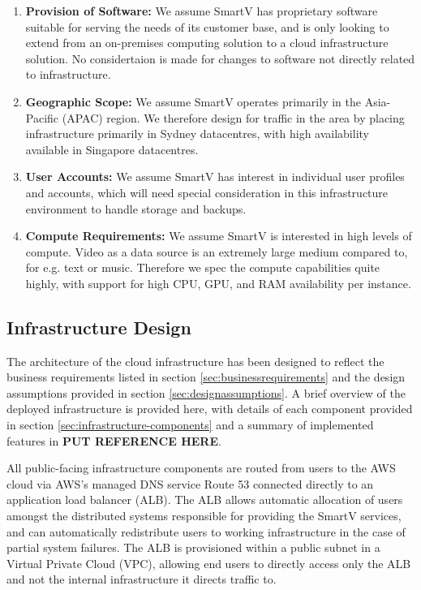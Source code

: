 \begin{enumerate}
    \item \textbf{Provision of Software:} We assume SmartV has proprietary software suitable for serving the needs of its customer base, and is only looking to extend from an on-premises computing solution to a cloud infrastructure solution. No considertaion is made for changes to software not directly related to infrastructure.
    \item \textbf{Geographic Scope:} We assume SmartV operates primarily in the Asia-Pacific (APAC) region. We therefore design for traffic in the area by placing infrastructure primarily in Sydney datacentres, with high availability available in Singapore datacentres.
    \item \textbf{User Accounts:} We assume SmartV has interest in individual user profiles and accounts, which will need special consideration in this infrastructure environment to handle storage and backups.
    \item \textbf{Compute Requirements:} We assume SmartV is interested in high levels of compute. Video as a data source is an extremely large medium compared to, for e.g. text or music. Therefore we spec the compute capabilities quite highly, with support for high CPU, GPU, and RAM availability per instance.
\end{enumerate}

\subsection{Infrastructure Design}

The architecture of the cloud infrastructure has been designed to reflect the business requirements listed in section \ref{sec:businessrequirements} and the design assumptions provided in section \ref{sec:designassumptions}. A brief overview of the deployed infrastructure is provided here, with details of each component provided in section \ref{sec:infrastructure-components} and a summary of implemented features in \textbf{PUT REFERENCE HERE}.

All public-facing infrastructure components are routed from users to the AWS cloud via AWS's managed DNS service Route 53 connected directly to an application load balancer (ALB). The ALB allows automatic allocation of users amongst the distributed systems responsible for providing the SmartV services, and can automatically redistribute users to working infrastructure in the case of partial system failures. The ALB is provisioned within a public subnet in a Virtual Private Cloud (VPC), allowing end users to directly access only the ALB and not the internal infrastructure it directs traffic to.

